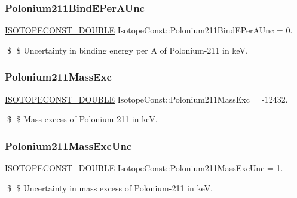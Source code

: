 \subsubsection{\texorpdfstring{Polonium211\+Bind\+E\+Per\+A\+Unc}{Polonium211BindEPerAUnc}}
{\footnotesize\ttfamily \mbox{\hyperlink{group___isotope_const-_macros_ga8f45a7272ce02c0b4c65c44636ed719a}{I\+S\+O\+T\+O\+P\+E\+C\+O\+N\+S\+T\+\_\+\+D\+O\+U\+B\+LE}} Isotope\+Const\+::\+Polonium211\+Bind\+E\+Per\+A\+Unc = 0.}

\$ \$ Uncertainty in binding energy per A of Polonium-\/211 in keV. \mbox{\label{group___isotope_const-_polonium-_po211_ga17c186f52acfe18986c7e1e7f4172ca5}} 
\subsubsection{\texorpdfstring{Polonium211\+Mass\+Exc}{Polonium211MassExc}}
{\footnotesize\ttfamily \mbox{\hyperlink{group___isotope_const-_macros_ga8f45a7272ce02c0b4c65c44636ed719a}{I\+S\+O\+T\+O\+P\+E\+C\+O\+N\+S\+T\+\_\+\+D\+O\+U\+B\+LE}} Isotope\+Const\+::\+Polonium211\+Mass\+Exc = -\/12432.}

\$ \$ Mass excess of Polonium-\/211 in keV. \mbox{\label{group___isotope_const-_polonium-_po211_ga189e056204effe5318908b23b29dc7c3}} 
\subsubsection{\texorpdfstring{Polonium211\+Mass\+Exc\+Unc}{Polonium211MassExcUnc}}
{\footnotesize\ttfamily \mbox{\hyperlink{group___isotope_const-_macros_ga8f45a7272ce02c0b4c65c44636ed719a}{I\+S\+O\+T\+O\+P\+E\+C\+O\+N\+S\+T\+\_\+\+D\+O\+U\+B\+LE}} Isotope\+Const\+::\+Polonium211\+Mass\+Exc\+Unc = 1.}

\$ \$ Uncertainty in mass excess of Polonium-\/211 in keV. \mbox{\label{group___isotope_const-_polonium-_po211_ga00618eea255de848f42d679a465c0b39}} 
